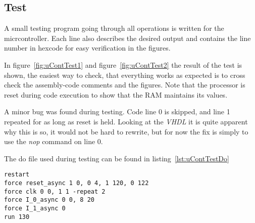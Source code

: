 \subsection{Test}
A small testing program going through all operations is written for the
micrcontroller. Each line also describes the desired output and contains the
line number in hexcode for easy verification in the figures.




In figure~\ref{fig:uContTest1} and figure~\ref{fig:uContTest2} the result of the
test is shown, the easiest way to check, that everything works as expected is to
cross check the assembly-code comments and the figures. Note that the processor
is reset during code execution to show that the RAM maintains its values.


A minor bug was found during testing. Code line 0 is skipped, and line 1
repeated for as long as reset is held. Looking at the \emph{VHDL} it is quite
apparent why this is so, it would not be hard to rewrite, but for now the fix is
simply to use the \emph{nop} command on line 0.

The do file used during testing can be found in listing~\ref{lst:uContTestDo}

\begin{lstlisting}[caption={Do file for the test of the microcontroller},
label={lst:uContTestDo}]
restart
force reset_async 1 0, 0 4, 1 120, 0 122
force clk 0 0, 1 1 -repeat 2
force I_0_async 0 0, 8 20
force I_1_async 0
run 130
\end{lstlisting}